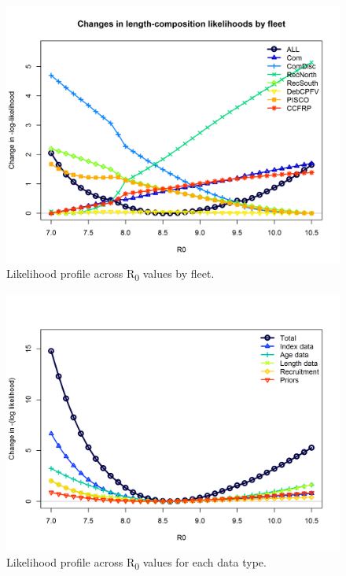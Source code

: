 \documentclass[12pt,]{article}
\begin{document}
\begin{figure}
\centering
\includegraphics{Figures/profile_R0_piner.png}
\caption{Likelihood profile across R\textsubscript{0} values by fleet.
\label{fig:profile_R0_piner}}
\end{figure}

\begin{figure}
\centering
\includegraphics{Figures/profile_R0_like.png}
\caption{Likelihood profile across R\textsubscript{0} values for each
data type. \label{fig:profile_R0_like}}
\end{figure}
\end{document}
